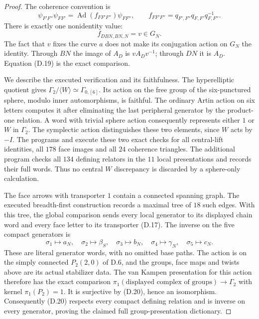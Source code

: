 \begin{proof}
The coherence convention is
\[
 \psi_{F'F''}\psi_{FF'}
       =\operatorname{Ad}(f_{FF'F''})\psi_{FF''},\qquad
 f_{FF'F''}=q_{F',F''}q_{F,F'}q_{F,F''}^{-1}.
\]
There is exactly one nonidentity value:
\[
                  f_{DBN,BN,N}=v\in G_N.                   \tag{D.19}
\]
The fact that $v$ fixes the curve $a$ does not make its
conjugation action on $G_N$ the identity.  Through $BN$
the image of $A_D$ is $vA_Dv^{-1}$; through $DN$ it is
$A_D$.  Equation (D.19) is the exact comparison.

We describe the executed verification and its faithfulness.
The hyperelliptic quotient gives
$\Gamma_2/\langle W\rangle\simeq\Gamma_{0,[6]}$.
Its action on the free group of the six-punctured sphere,
modulo inner automorphisms, is faithful.  The ordinary
Artin action on six letters computes it after eliminating
the last peripheral generator by the product-one relation.
A word with trivial sphere action consequently represents
either $1$ or $W$ in $\Gamma_2$.
The symplectic action distinguishes these two elements,
since $W$ acts by $-I$.
The programs  and
 execute these two exact
checks for all central-lift identities, all $178$ face
images and all $24$ coherence triangles.
The additional program 
checks all $134$ defining relators in the $11$ local
presentations and records their full words.  Thus no
central $W$ discrepancy is discarded by a sphere-only
calculation.

The face arrows with transporter $1$ contain a connected
spanning graph.  The executed breadth-first construction
records a maximal tree of $18$ such edges.  With this
tree, the global comparison sends every local generator
to its displayed chain word and every face letter to its
transporter (D.17).  The inverse on the five compact
generators is
\[
 \sigma_1\mapsto a_N,\quad
 \sigma_2\mapsto\beta_S,\quad
 \sigma_3\mapsto b_N,\quad
 \sigma_4\mapsto\gamma_N,\quad
 \sigma_5\mapsto c_N.                                       \tag{D.20}
\]
These are literal generator words, with no omitted base
paths.  The action is on the simply connected $P_2(2,0)$
of D.6, and the groups, face maps and twists above are its
actual stabilizer data.  The van Kampen presentation for
this action therefore has the exact comparison
$\pi_1(\text{displayed complex of groups})\to\Gamma_2$
with kernel $\pi_1(P_2)=1$.
It is surjective by (D.20), hence an isomorphism.
Consequently (D.20) respects every compact defining
relation and is inverse on every generator, proving the
claimed full group-presentation dictionary.


\end{proof}
